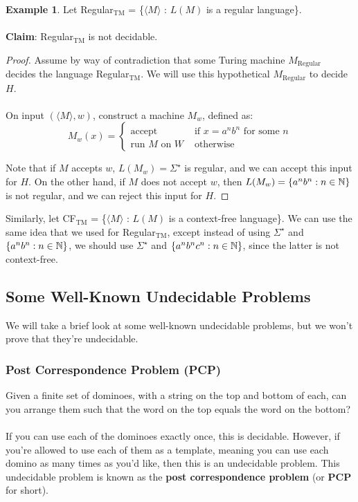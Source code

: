 \documentclass[]{article}
\DeclarePairedDelimiter{\set}{\lbrace}{\rbrace}
\theoremstyle{definition}
\newtheorem{ex}{Example}[section]
\begin{document}
      \begin{ex}
        Let Regular$_\text{TM}$ = \{$\langle M \rangle$ : $L(M)$ is a regular language\}.
        \\ \\
        \textbf{Claim}: Regular$_\text{TM}$ is not decidable.

        \begin{proof}
          Assume by way of contradiction that some Turing machine $M_\text{Regular}$ decides the language Regular$_\text{TM}$. We will use this hypothetical $M_\text{Regular}$ to decide $H$.
          \\ \\
          On input $(\langle M \rangle, w)$, construct a machine $M_w$, defined as:
          $$
            M_w(x) = \begin{cases}
              \text{accept} & \text{ if } x = a^n b^n \text{ for some } n \\
              \text{run } M \text{ on } W & \text{ otherwise}
            \end{cases}
          $$

          Note that if $M$ accepts $w$, $L(M_w) = \Sigma^\star$ is regular, and we can accept this input for $H$. On the other hand, if $M$ does not accept $w$, then $L(M_w) = \set{ a^n b^n : n \in \mathbb{N} }$ is not regular, and we can reject this input for $H$.
        \end{proof}

        Similarly, let CF$_\text{TM}$ = \{$\langle M \rangle$ : $L(M)$ is a context-free language\}. We can use the same idea that we used for Regular$_\text{TM}$, except instead of using $\Sigma^\star$ and $\set{a^n b^n : n \in \mathbb{N} }$, we should use $\Sigma^\star$ and $\set{a^n b^n c^n : n \in \mathbb{N} }$, since the latter is not context-free.
      \end{ex}

    \subsection{Some Well-Known Undecidable Problems}
      We will take a brief look at some well-known undecidable problems, but we won't prove that they're undecidable.

      \subsubsection{Post Correspondence Problem (PCP)}
        Given a finite set of dominoes, with a string on the top and bottom of each, can you arrange them such that the word on the top equals the word on the bottom?
        \\ \\
        If you can use each of the dominoes exactly once, this is decidable. However, if you're allowed to use each of them as a template, meaning you can use each domino as many times as you'd like, then this is an undecidable problem. This undecidable problem is known as the \textbf{post correspondence problem} (or \textbf{PCP} for short).
\end{document}
